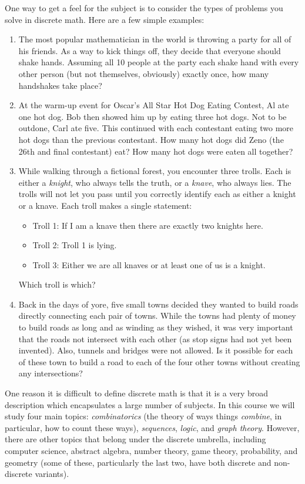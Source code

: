 \documentclass[12pt]{article}
\begin{document}
One way to get a feel for the subject is to consider the types of problems you solve in discrete math.  Here are a few simple examples:

\begin{enumerate}
\item The most popular mathematician in the world is throwing a party for all of his friends.  As a way to kick things off, they decide that everyone should shake hands.  Assuming all 10 people at the party each shake hand with every other person (but not themselves, obviously) exactly once, how many handshakes take place?

\item At the warm-up event for Oscar's All Star Hot Dog Eating Contest, Al ate one hot dog.  Bob then showed him up by eating three hot dogs.  Not to be outdone, Carl ate five.  This continued with each contestant eating two more hot dogs than the previous contestant. How many hot dogs did Zeno (the 26th and final contestant) eat? How many hot dogs were eaten all together?

\item While walking through a fictional forest, you encounter three trolls.  Each is either a {\em knight}, who always tells the truth, or a {\em knave}, who always lies.  The trolls will not let you pass until you correctly identify each as either a knight or a knave.  Each troll makes a single statement:
  \begin{itemize}
   \item[] Troll 1: If I am a knave then there are exactly two knights here. 
   \item[] Troll 2: Troll 1 is lying.
   \item[] Troll 3: Either we are all knaves or at least one of us is a knight.
  \end{itemize}
Which troll is which? 

\item Back in the days of yore, five small towns decided they wanted to build roads directly connecting each pair of towns. While the towns had plenty of money to build roads as long and as winding as they wished, it was very important that the roads not intersect with each other (as stop signs had not yet been invented). Also, tunnels and bridges were not allowed. Is it possible for each of these town to build a road to each of the four other towns without creating any intersections? 
\end{enumerate}

One reason it is difficult to define discrete math is that it is a very broad description which encapsulates a large number of subjects.  In this course we will study four main topics: {\em combinatorics} (the theory of ways things {\em combine}, in particular, how to count these ways), {\em sequences}, {\em logic}, and {\em graph theory}.  However, there are other topics that belong under the discrete umbrella, including computer science, abstract algebra, number theory, game theory, probability, and geometry (some of these, particularly the last two, have both discrete and non-discrete variants).  
\end{document}
